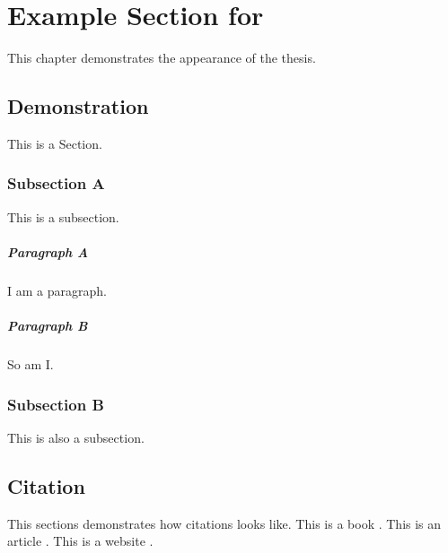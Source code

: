 \chapter{Example Section for \texttt{\classname}}\label{ch:ex}
This chapter demonstrates the appearance of the thesis. 
\section{Demonstration}
This is a Section.
\subsection{Subsection A}
This is a subsection. \kant[1]
\paragraph{Paragraph A}
I am a paragraph. 
\paragraph{Paragraph B}
So am I.
\subsection{Subsection B}
This is also a subsection.
\section{Citation}
This sections demonstrates how citations looks like.
This is a book \cite{Evans15}. This is an article \cite{Ben02}. This is a 
website \cite{FAUreg}.
